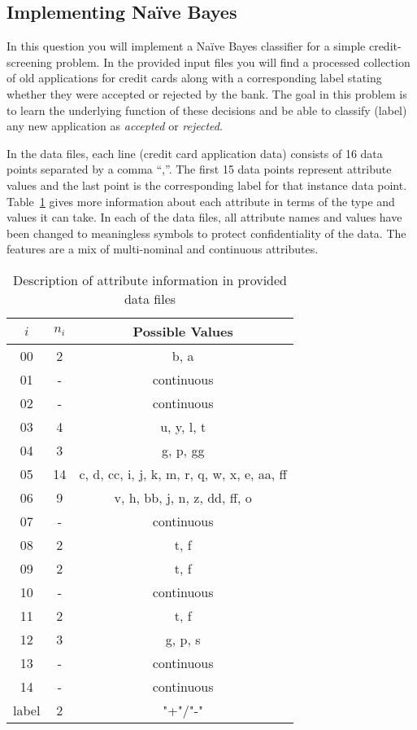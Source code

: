 \vspace*{1ex}  

\pagebreak



\newpage
\subsection{Implementing Na\"{i}ve Bayes }
In this question you will implement a Na\"{i}ve Bayes classifier for a simple credit-screening problem. In the provided input files you will find a processed collection of old applications for credit cards along with a corresponding label stating whether they were accepted or rejected by the bank. The goal in this problem is to learn the underlying function of these decisions and be able to classify (label) any new application as {\em accepted} or {\em rejected}. 

In the data files, each line (credit card application data) consists of 16 data points separated by a comma ``,''. The first 15 data points represent attribute values and the last point is the corresponding label for that instance data point. Table~\ref{tab:data_spec} gives more information about each attribute in terms of the type and values it can take. In each of the data files, all attribute names and values have been changed to meaningless symbols to protect confidentiality of the data. The features are a mix of multi-nominal and continuous attributes. 

\begin{table}[t]
    \centering
    \begin{tabular}{| c | c | c |} 
   \hline
    $i$ & $n_{i}$ & Possible Values \\\hline
    00 & 2 &  b, a \\\hline 
    01 & - & continuous \\\hline
    02 & - & continuous \\\hline
    03 & 4 & u, y, l, t \\\hline
    04 & 3 & g, p, gg \\\hline
    05 & 14 & c, d, cc, i, j, k, m, r, q, w, x, e, aa, ff \\\hline
    06 & 9 & v, h, bb, j, n, z, dd, ff, o \\\hline
    07 & - & continuous \\\hline 
    08 & 2 & t, f \\\hline
    09 & 2 & t, f \\\hline
    10 & - & continuous \\\hline
    11 & 2 & t, f \\\hline
    12 & 3 & g, p, s \\\hline
    13 & - & continuous \\\hline
    14 & - & continuous \\\hline \hline
    label & 2 & "+"/"-" \\\hline
\end{tabular}
    \caption{Description of attribute information in provided data files}
    \label{tab:data_spec}
\end{table}

